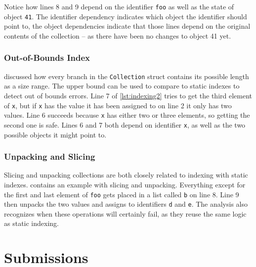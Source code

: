 \documentclass[a4paper, 16pt, oneside]{Thesis}
\begin{document}
Notice how lines 8 and 9 depend on the identifier \texttt{foo} as well
as the state of object \texttt{41}. The identifier dependency indicates
which object the identifier should point to, the object dependencies
indicate that those lines depend on the original contents of the
collection -- as there have been no changes to object 41 yet.

\subsubsection{Out-of-Bounds Index}\label{out-of-bounds-index}

 discussed how every branch in the \texttt{Collection}
struct contains its possible length as a size range. The upper bound can
be used to compare to static indexes to detect out of bounds errors.
Line 7 of \cref{lst:indexing2} tries to get the third element of
\texttt{x}, but if \texttt{x} has the value it has been assigned to on
line 2 it only has two values. Line 6 succeeds because \texttt{x} has
either two or three elements, so getting the second one is safe. Lines 6
and 7 both depend on identifier \texttt{x}, as well as the two possible
objects it might point to.

 

\clearpage

\subsubsection{Unpacking and Slicing}\label{unpacking-and-slicing}

Slicing and unpacking collections are both closely related to indexing
with static indexes.  contains an example with
slicing and unpacking. Everything except for the first and last element
of \texttt{foo} gets placed in a list called \texttt{b} on line 8. Line
9 then unpacks the two values and assigns to identifiers \texttt{d} and
\texttt{e}. The analysis also recognizes when these operations will
certainly fail, as they reuse the same logic as static indexing.

\clearpage



\clearpage

\section{Submissions}\label{submissions}
\end{document}
